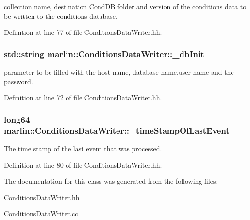 collection name, destination Cond\-D\-B folder and version of the conditions data to be written to the conditions database. 



Definition at line 77 of file Conditions\-Data\-Writer.\-hh.

\subsubsection[{\-\_\-db\-Init}]{\setlength{\rightskip}{0pt plus 5cm}std\-::string marlin\-::\-Conditions\-Data\-Writer\-::\-\_\-db\-Init\hspace{0.3cm}{\ttfamily [protected]}}\label{classmarlin_1_1ConditionsDataWriter_ad87dadf50a9e475515ea26bce299e449}


parameter to be filled with the host name, database name,user name and the password. 



Definition at line 72 of file Conditions\-Data\-Writer.\-hh.

\subsubsection[{\-\_\-time\-Stamp\-Of\-Last\-Event}]{\setlength{\rightskip}{0pt plus 5cm}long64 marlin\-::\-Conditions\-Data\-Writer\-::\-\_\-time\-Stamp\-Of\-Last\-Event\hspace{0.3cm}{\ttfamily [protected]}}\label{classmarlin_1_1ConditionsDataWriter_af2c6e1b189e2f665f8ef6beb7ad9c10b}


The time stamp of the last event that was processed. 



Definition at line 80 of file Conditions\-Data\-Writer.\-hh.



The documentation for this class was generated from the following files\-:\begin{DoxyCompactItemize}
\item 
Conditions\-Data\-Writer.\-hh\item 
Conditions\-Data\-Writer.\-cc\end{DoxyCompactItemize}
